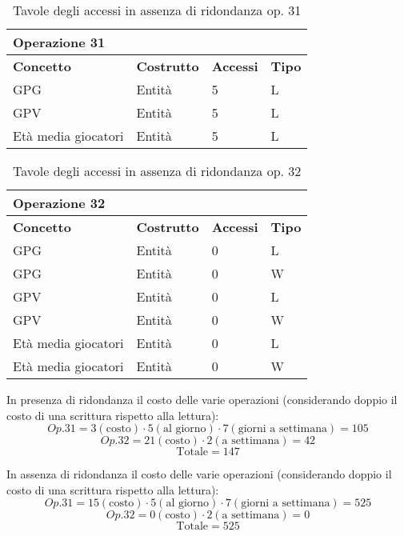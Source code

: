 \documentclass{article}
\begin{document}
\begin{table}[H]
    \centering
    \begin{tabularx}{\textwidth}{|X|X|X|X|}
        \hline 
        \textbf{Operazione 31} & & & \\ \hline
        \textbf{Concetto} & \textbf{Costrutto} & \textbf{Accessi} & \textbf{Tipo} \\ \hline
        GPG & Entità & 5 & L \\ \hline
        GPV & Entità & 5 & L \\ \hline
        Età media giocatori & Entità & 5 & L \\ \hline
    \end{tabularx}
    \caption{Tavole degli accessi in assenza di ridondanza op. 31}
\end{table}

\begin{table}
    \centering
    \begin{tabularx}{\textwidth}{|X|X|X|X|}
        \hline
        \textbf{Operazione 32} & & & \\ \hline
        \textbf{Concetto} & \textbf{Costrutto} & \textbf{Accessi} & \textbf{Tipo} \\ \hline
        GPG & Entità & 0 & L \\ \hline
        GPG & Entità & 0 & W \\ \hline
        GPV & Entità & 0 & L \\ \hline
        GPV & Entità & 0 & W \\ \hline
        Età media giocatori & Entità & 0 & L \\ \hline
        Età media giocatori & Entità & 0 & W \\ \hline
    \end{tabularx}
    \caption{Tavole degli accessi in assenza di ridondanza op. 32}
\end{table}

In presenza di ridondanza il costo delle varie operazioni (considerando doppio il costo di una scrittura rispetto alla lettura):
$$ Op.31 = 3 (\text{costo}) \cdot 5 (\text{al giorno}) \cdot 7 (\text{giorni a settimana}) = 105 $$
$$ Op.32 = 21 (\text{costo}) \cdot 2 (\text{a settimana}) = 42 $$
$$\text{Totale} = 147$$

In assenza di ridondanza il costo delle varie operazioni (considerando doppio il costo di una scrittura rispetto alla lettura):
$$ Op.31 = 15 (\text{costo}) \cdot 5 (\text{al giorno}) \cdot 7 (\text{giorni a settimana}) = 525 $$
$$ Op.32 = 0 (\text{costo}) \cdot 2 (\text{a settimana}) = 0 $$
$$\text{Totale} = 525$$
\end{document}
